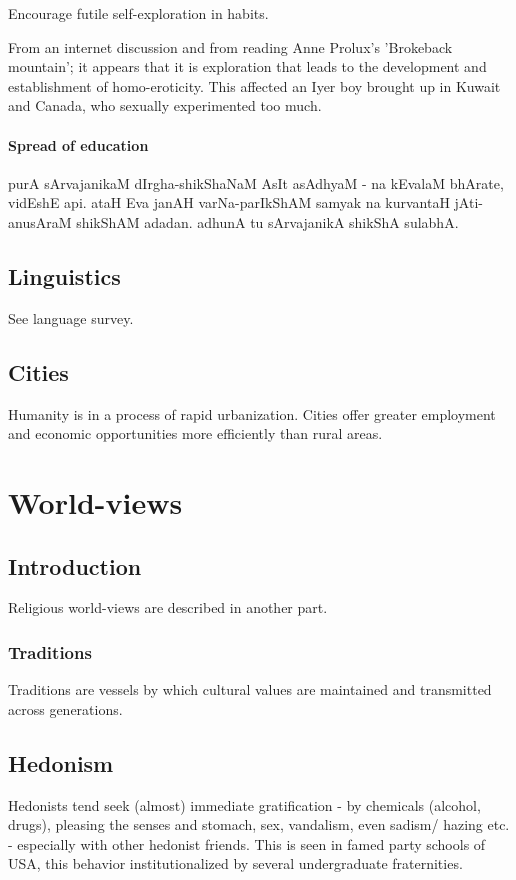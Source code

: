 \documentclass[oneside, article]{memoir}
\begin{document}
Encourage futile self-exploration in habits.

From an internet discussion and from reading Anne Prolux's 'Brokeback mountain'; it appears that it is exploration that leads to the development and establishment of homo-eroticity. This affected an Iyer boy brought up in Kuwait and Canada, who sexually experimented too much.

\subsection{Spread of education}
purA sArvajanikaM dIrgha-shikShaNaM AsIt asAdhyaM - na kEvalaM bhArate, vidEshE api. ataH Eva janAH varNa-parIkShAM samyak na kurvantaH jAti-anusAraM shikShAM adadan. adhunA tu sArvajanikA shikShA sulabhA.

\chapter{Linguistics}
See language survey.

\chapter{Cities}
Humanity is in a process of rapid urbanization. Cities offer greater employment and economic opportunities more efficiently than rural areas.

\part{World-views}
\chapter{Introduction}
Religious world-views are described in another part.

\section{Traditions}
Traditions are vessels by which cultural values are maintained and transmitted across generations.

\chapter{Hedonism}
Hedonists tend seek (almost) immediate gratification - by chemicals (alcohol, drugs), pleasing the senses and stomach, sex, vandalism, even sadism/ hazing etc. - especially with other hedonist friends. This is seen in famed party schools of USA, this behavior institutionalized by several undergraduate fraternities.
\end{document}
